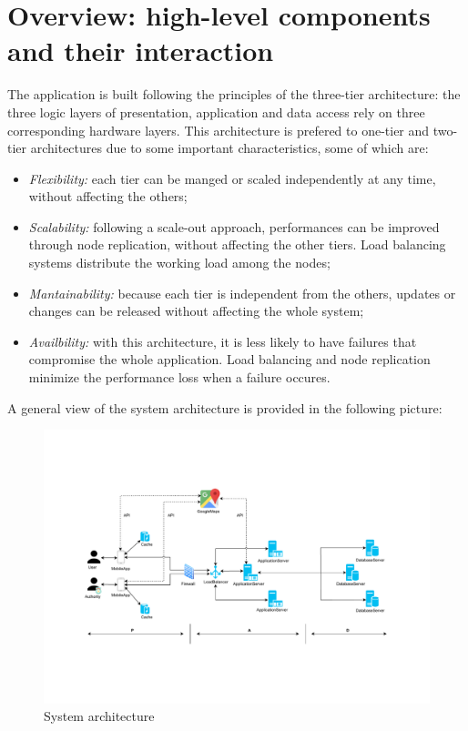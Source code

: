 \documentclass[12pt,a4paper]{report}
\begin{document}
		\section{Overview:	high-level	components	and	their	interaction}
	The application is built following the principles of the three-tier architecture: the three logic layers of presentation, 				application and data access rely on three corresponding hardware layers. This architecture is prefered to one-tier and 			two-tier architectures due to some important characteristics, some of which are:
	\begin{itemize}
	\item \emph{Flexibility:} each tier can be manged or scaled independently at any time, without affecting the others;
	\item \emph{Scalability:} following a scale-out approach, performances can be improved through node replication, without affecting the other tiers.
	Load balancing systems distribute the working load among the nodes;
	\item \emph{Mantainability:} because each tier is independent from the others, updates or changes can be released
	without affecting the whole system;
	\item \emph{Availbility:} with this architecture, it is less likely to have failures that compromise the whole application.
	Load balancing and node replication minimize the performance loss when a failure occures.
	\end{itemize}
	A general view of the system architecture is provided in the following picture:
	\begin{figure}[H]
			\includegraphics[scale = 0.6, center]{sysarch}
			\caption{System architecture}
	\end{figure}
\end{document}
